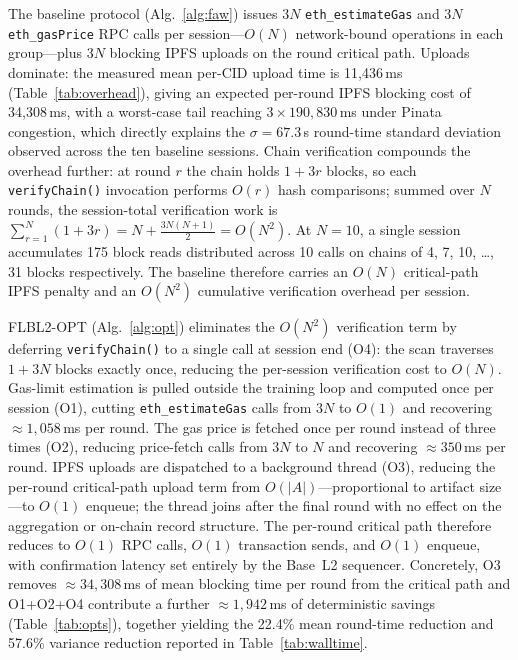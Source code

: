 \documentclass{llncs}
\begin{document}
The baseline protocol (Alg.~\ref{alg:faw}) issues $3N$ \texttt{eth\_estimateGas} and $3N$
\texttt{eth\_gasPrice} RPC calls per session---$O(N)$ network-bound operations in each
group---plus $3N$ blocking IPFS uploads on the round critical path.
Uploads dominate: the measured mean per-CID upload time is 11{,}436\,ms
(Table~\ref{tab:overhead}), giving an expected per-round IPFS blocking cost of
34{,}308\,ms, with a worst-case tail reaching $3\times190{,}830$\,ms under Pinata
congestion, which directly explains the $\sigma{=}67.3$\,s round-time standard
deviation observed across the ten baseline sessions.
Chain verification compounds the overhead further: at round $r$ the chain holds
$1{+}3r$ blocks, so each \texttt{verifyChain()} invocation performs $O(r)$ hash
comparisons; summed over $N$ rounds, the session-total verification work is
$\sum_{r=1}^{N}(1{+}3r)=N+\tfrac{3N(N+1)}{2}=O(N^2)$.
At $N{=}10$, a single session accumulates 175 block reads distributed across 10
calls on chains of 4, 7, 10, \ldots, 31 blocks respectively.
The baseline therefore carries an $O(N)$ critical-path IPFS penalty and an
$O(N^2)$ cumulative verification overhead per session.

FLBL2-OPT (Alg.~\ref{alg:opt}) eliminates the $O(N^2)$ verification term by
deferring \texttt{verifyChain()} to a single call at session end (O4): the scan
traverses $1{+}3N$ blocks exactly once, reducing the per-session verification cost
to $O(N)$.
Gas-limit estimation is pulled outside the training loop and computed once per
session (O1), cutting \texttt{eth\_estimateGas} calls from $3N$ to $O(1)$ and
recovering $\approx1{,}058$\,ms per round.
The gas price is fetched once per round instead of three times (O2), reducing
price-fetch calls from $3N$ to $N$ and recovering $\approx350$\,ms per round.
IPFS uploads are dispatched to a background thread (O3), reducing the per-round
critical-path upload term from $O(|A|)$---proportional to artifact size---to
$O(1)$ enqueue; the thread joins after the final round with no effect on the
aggregation or on-chain record structure.
The per-round critical path therefore reduces to $O(1)$ RPC calls, $O(1)$
transaction sends, and $O(1)$ enqueue, with confirmation latency set entirely
by the Base~L2 sequencer.
Concretely, O3 removes $\approx34{,}308$\,ms of mean blocking time per round from
the critical path and O1+O2+O4 contribute a further $\approx1{,}942$\,ms of
deterministic savings (Table~\ref{tab:opts}), together yielding the 22.4\% mean
round-time reduction and 57.6\% variance reduction reported in Table~\ref{tab:walltime}.
\end{document}
